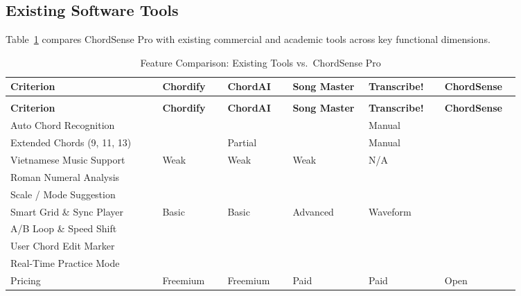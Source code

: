 \documentclass[a4paper]{article}
\newcommand{\cmark}{\ding{51}}
\newcommand{\xmark}{\ding{55}}
\begin{document}
\subsection{Existing Software Tools}

Table~\ref{tab:sota_comparison} compares ChordSense Pro with existing commercial and academic tools across key functional dimensions.

\begin{longtable}{@{}
    >{\raggedright\arraybackslash}p{0.28\linewidth}
    >{\centering\arraybackslash}p{0.12\linewidth}
    >{\centering\arraybackslash}p{0.12\linewidth}
    >{\centering\arraybackslash}p{0.14\linewidth}
    >{\centering\arraybackslash}p{0.14\linewidth}
    >{\centering\arraybackslash}p{0.14\linewidth}@{}}

    \caption{Feature Comparison: Existing Tools vs.\ ChordSense Pro}\label{tab:sota_comparison} \\
    \toprule
    \textbf{Criterion} & \textbf{Chordify} & \textbf{ChordAI} & \textbf{Song Master} & \textbf{Transcribe!} & \textbf{ChordSense} \\
    \midrule
    \endfirsthead
    \multicolumn{6}{l}{\footnotesize\itshape (Table~\ref{tab:sota_comparison} continued)}\\
    \toprule
    \textbf{Criterion} & \textbf{Chordify} & \textbf{ChordAI} & \textbf{Song Master} & \textbf{Transcribe!} & \textbf{ChordSense} \\
    \midrule
    \endhead
    \bottomrule
    \endlastfoot

    Auto Chord Recognition & \cmark & \cmark & \cmark & Manual & \cmark \\
    \addlinespace
    Extended Chords (9, 11, 13) & \xmark & Partial & \xmark & Manual & \cmark \\
    \addlinespace
    Vietnamese Music Support & Weak & Weak & Weak & N/A & \cmark \\
    \addlinespace
    Roman Numeral Analysis & \xmark & \xmark & \xmark & \xmark & \cmark \\
    \addlinespace
    Scale / Mode Suggestion & \xmark & \xmark & \xmark & \xmark & \cmark \\
    \addlinespace
    Smart Grid \& Sync Player & Basic & Basic & Advanced & Waveform & \cmark \\
    \addlinespace
    A/B Loop \& Speed Shift & \xmark & \xmark & \cmark & \cmark & \cmark \\
    \addlinespace
    User Chord Edit Marker & \xmark & \xmark & \xmark & \cmark & \cmark \\
    \addlinespace
    Real-Time Practice Mode & \xmark & \cmark & \xmark & \xmark & \cmark \\
    \addlinespace
    Pricing & Freemium & Freemium & Paid & Paid & Open \\
\end{longtable}
\end{document}
